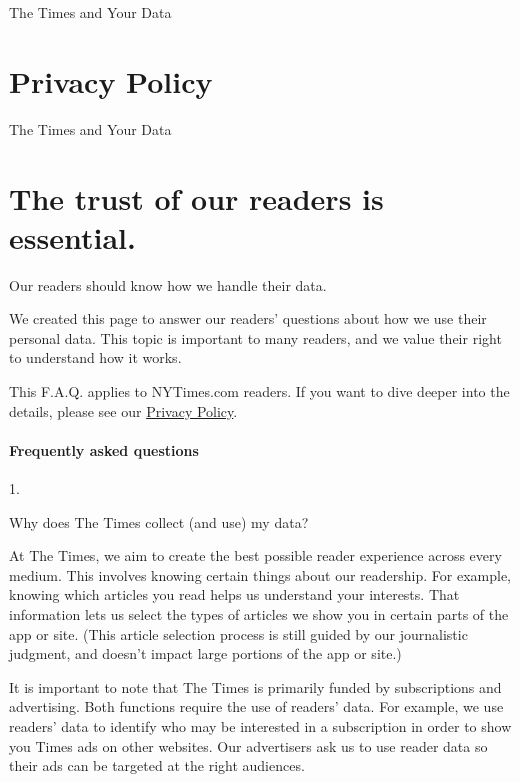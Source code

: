 The Times and Your Data

\hypertarget{privacy-policy}{%
\section{Privacy Policy}\label{privacy-policy}}

The Times and Your Data

\hypertarget{the-trust-of-our-readers-is-essential}{%
\section{The trust of our readers is
essential.}\label{the-trust-of-our-readers-is-essential}}

Our readers should know how we handle their data.

We created this page to answer our readers' questions about how we use
their personal data. This topic is important to many readers, and we
value their right to understand how it works.

This F.A.Q. applies to NYTimes.com readers. If you want to dive deeper
into the details, please see our \href{/privacy/privacy-policy}{Privacy
Policy}.

\hypertarget{frequently-asked-questions}{%
\paragraph{Frequently asked
questions}\label{frequently-asked-questions}}

1.

Why does The Times collect (and use) my data?

At The Times, we aim to create the best possible reader experience
across every medium. This involves knowing certain things about our
readership. For example, knowing which articles you read helps us
understand your interests. That information lets us select the types of
articles we show you in certain parts of the app or site. (This article
selection process is still guided by our journalistic judgment, and
doesn't impact large portions of the app or site.)

It is important to note that The Times is primarily funded by
subscriptions and advertising. Both functions require the use of
readers' data. For example, we use readers' data to identify who may be
interested in a subscription in order to show you Times ads on other
websites. Our advertisers ask us to use reader data so their ads can be
targeted at the right audiences.

